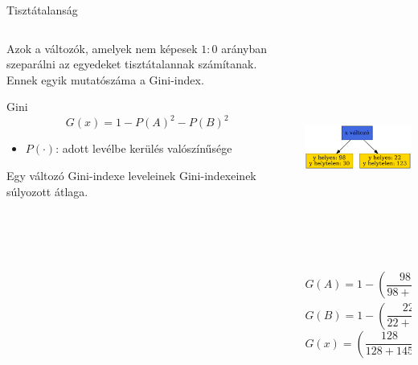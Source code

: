 \documentclass[english, aspectratio=169]{beamer}
\makeatletter
\let\origtableofcontents=\tableofcontents
\def\tableofcontents{\@ifnextchar[{\origtableofcontents}{\gobbletableofcontents}}
\def\gobbletableofcontents#1{\origtableofcontents}
\makeatother
\begin{document}
\begin{frame}
\tableofcontents[currentsection]
\end{frame}

\begin{frame}{Tisztátalanság}
\begin{columns}
\begin{column}{.4\textwidth}
Azok a változók, amelyek nem képesek $1:0$ arányban szeparálni az egyedeket tisztátalannak számítanak. Ennek egyik mutatószáma a Gini-index.
\begin{block}{Gini}
\vspace{-.2cm}
\[
G\left( x \right) = 1 - P\left(A\right)^2 - P\left(B\right)^2 
\]
\vspace{-.5cm}
\begin{itemize}
	\item $P\left(\cdot\right)$: adott levélbe kerülés valószínűsége
\end{itemize}
Egy változó Gini-indexe leveleinek Gini-indexeinek súlyozott átlaga.
\end{block}
\end{column}
\begin{column}{.6\textwidth}
\begin{center}
\includegraphics[width=7cm, height=7cm, keepaspectratio]{graphs/decision_trees_5.png}
\end{center}
\[
G\left(A\right) = 1 - \left(\frac{98}{98 + 30}\right)^2 - \left(\frac{30}{98 + 30}\right)^2 = 0.35
\]
\[
G\left(B\right) = 1 - \left(\frac{22}{22 + 123}\right)^2 - \left(\frac{123}{22 + 123}\right)^2 = 0.25
\]
\[
G\left(x\right) = \left( \frac{128}{128 + 145} \right)0.35 + \left( \frac{145}{128 + 145} \right) 0.25 = 0.3
\]
\end{column}
\end{columns}
\end{frame}
\end{document}
